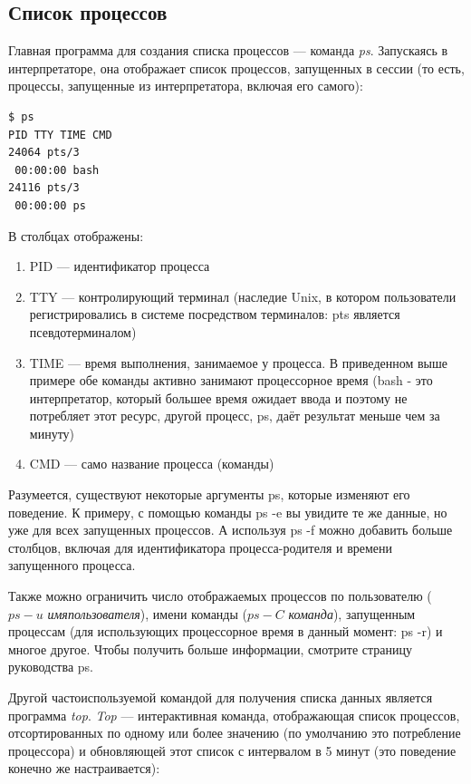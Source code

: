 \documentclass[10pt]{book}
\begin{document}
\subsection{Список процессов}
Главная программа для создания списка процессов — команда \textit{ps}. Запускаясь в интерпретаторе, она отображает  список процессов, запущенных в сессии (то есть, процессы, запущенные из интерпретатора, включая его самого):

\vspace{3mm}
\begin{tcolorbox}
\begin{lstlisting}
$ ps
PID TTY TIME CMD
24064 pts/3
 00:00:00 bash
24116 pts/3
 00:00:00 ps
\end{lstlisting}
\end{tcolorbox}

В столбцах отображены:
\begin{enumerate}
\item PID — идентификатор процесса 
\item TTY — контролирующий терминал (наследие Unix, в котором пользователи регистрировались в системе посредством терминалов: pts является псевдотерминалом)
\item TIME — время выполнения, занимаемое у процесса. В приведенном выше примере обе команды активно занимают процессорное время (bash - это интерпретатор, который большее время ожидает ввода и поэтому не потребляет этот ресурс, другой процесс, ps, даёт результат меньше чем за минуту)
\item CMD — само название процесса (команды)
\end{enumerate}

Разумеется, существуют некоторые аргументы ps, которые изменяют его поведение. К примеру, с помощью команды ps -e вы увидите те же данные, но уже для всех запущенных процессов. А используя ps -f можно добавить больше столбцов, включая для идентификатора процесса-родителя и времени запущенного процесса.

Также можно ограничить число отображаемых процессов по пользователю ($ps -u$ \textit{имяпользователя}), имени команды ($ps -C$ \textit{команда}), запущенным процессам (для использующих процессорное время в данный момент: ps -r) и многое другое. Чтобы получить больше информации, смотрите страницу руководства ps.

Другой частоиспользуемой командой для получения списка данных является программа \textit{top}. \textit{Top} — интерактивная команда, отображающая список процессов, отсортированных по одному или более значению (по умолчанию это потребление процессора) и обновляющей этот список с интервалом в 5 минут (это поведение конечно же настраивается):
\end{document}
